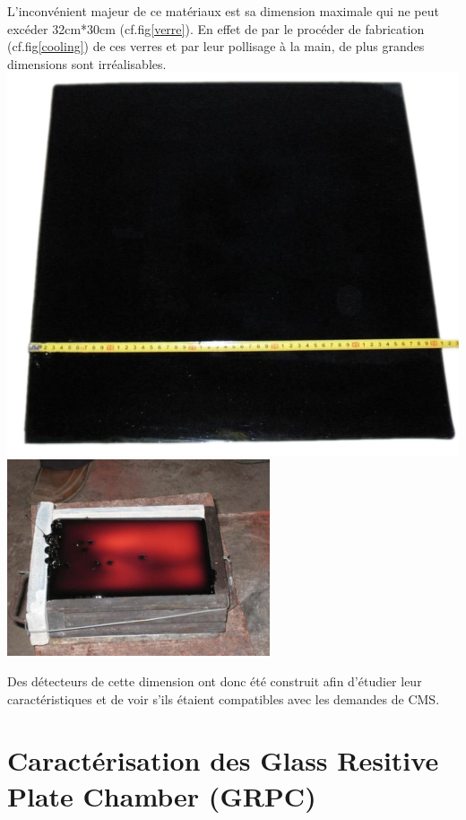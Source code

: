 L'inconvénient majeur de ce matériaux est sa dimension maximale qui ne peut excéder 32cm*30cm (cf.fig\ref{verre}). En effet de par le procéder de fabrication (cf.fig\ref{cooling}) de ces verres et par leur pollisage à la main, de plus grandes dimensions sont irréalisables.
\marginpar
{
	\centering
	\includegraphics[width=\marginparwidth]{GLA/verre.png}
	\label{verre}
}
\marginpar
{
	\centering
	\includegraphics[width=\marginparwidth]{GLA/cooling.png}
	\label{cooling}
}

Des détecteurs de cette dimension ont donc été construit afin d'étudier leur caractéristiques et de voir s'ils étaient compatibles avec les demandes de CMS.

\section{Caractérisation des Glass Resitive Plate Chamber (GRPC)}
 
